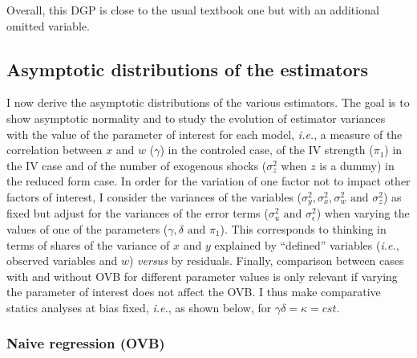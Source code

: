 \documentclass[usletter, 12pt]{article}
\begin{document}
				Overall, this DGP is close to the usual textbook one but with an additional omitted variable.

				
		
		\subsection{Asymptotic distributions of the estimators}\label{maths_asymptotics}			 
			
			I now derive the asymptotic distributions of the various estimators. The goal is to show asymptotic normality and to study the evolution of estimator variances with the value of the parameter of interest for each model, \textit{i.e.}, a measure of the correlation between $x$ and $w$ ($\gamma$) in the controled case, of the IV strength ($\pi_{1}$) in the IV case and of the number of exogenous shocks ($\sigma_{z}^{2}$ when $z$ is a dummy) in the reduced form case.  %
			In order for the variation of one factor not to impact other factors of interest, I consider the variances of the variables ($\sigma_{y}^{2}, \sigma_{x}^{2}, \sigma_{w}^{2} \text{ and } \sigma_{z}^{2}$) as fixed but adjust for the variances of the error terms ($\sigma_{u}^{2} \text{ and } \sigma_{\epsilon}^{2}$) when varying the values of one of the parameters ($\gamma, \delta \text{ and } \pi_{1}$). This corresponds to thinking in terms of shares of the variance of $x$ and $y$ explained by ``defined'' variables (\textit{i.e.}, observed variables and $w$) \textit{versus} by residuals. Finally, comparison between cases with and without OVB for different parameter values is only relevant if varying the parameter of interest does not affect the OVB. I thus make comparative statics analyses at bias fixed, \textit{i.e.}, as shown below, for $\gamma \delta = \kappa = cst$.
			

			\subsubsection{Naive regression (OVB)}\label{formal_proof_ovb}
			
\end{document}

